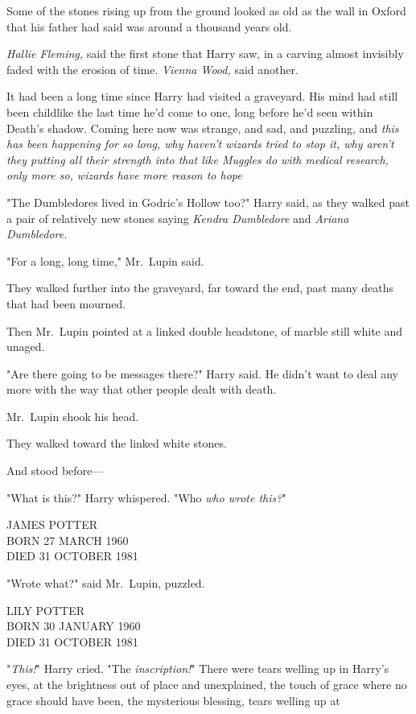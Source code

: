 Some of the stones rising up from the ground looked as old as the wall in
Oxford that his father had said was around a thousand years old.

\emph{Hallie Fleming,} said the first stone that Harry saw, in a carving almost
invisibly faded with the erosion of time. \emph{Vienna Wood,} said another.

It had been a long time since Harry had visited a graveyard. His mind had still
been childlike the last time he'd come to one, long before he'd seen within
Death's shadow. Coming here now was{\el} strange, and sad, and puzzling, and
\emph{this has been happening for so long, why haven't wizards tried to stop
it, why aren't they putting all their strength into that like Muggles do with
medical research, only more so, wizards have more reason to hope{\el}}

"The Dumbledores lived in Godric's Hollow too?" Harry said, as they walked past
a pair of relatively new stones saying \emph{Kendra Dumbledore} and
\emph{Ariana Dumbledore.}

"For a long, long time," Mr.~Lupin said.

They walked further into the graveyard, far toward the end, past many deaths
that had been mourned.

Then Mr.~Lupin pointed at a linked double headstone, of marble still white and
unaged.

"Are there going to be messages there?" Harry said. He didn't want to deal any
more with the way that other people dealt with death.

Mr.~Lupin shook his head.

They walked toward the linked white stones.

And stood before—

"What is this?" Harry whispered. "Who{\el} \emph{who wrote this?}"

\begin{center}
JAMES POTTER\\
BORN 27 MARCH 1960\\
DIED 31 OCTOBER 1981
\end{center}

"Wrote what?" said Mr.~Lupin, puzzled.

\begin{center}
LILY POTTER\\
BORN 30 JANUARY 1960\\
DIED 31 OCTOBER 1981
\end{center}

"\emph{This!}" Harry cried. "The \emph{inscription!}" There were tears welling
up in Harry's eyes, at the brightness out of place and unexplained, the touch
of grace where no grace should have been, the mysterious blessing, tears
welling up at

